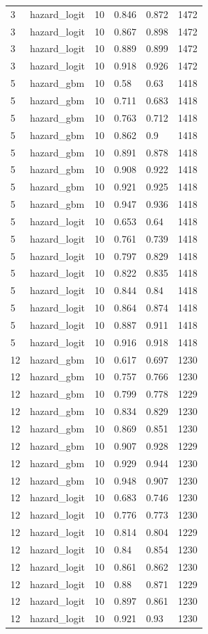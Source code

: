 \begin{tabular}{llllll}
3 & hazard\_logit & 10 & 0.846 & 0.872 & 1472 \\
3 & hazard\_logit & 10 & 0.867 & 0.898 & 1472 \\
3 & hazard\_logit & 10 & 0.889 & 0.899 & 1472 \\
3 & hazard\_logit & 10 & 0.918 & 0.926 & 1472 \\
5 & hazard\_gbm & 10 & 0.58 & 0.63 & 1418 \\
5 & hazard\_gbm & 10 & 0.711 & 0.683 & 1418 \\
5 & hazard\_gbm & 10 & 0.763 & 0.712 & 1418 \\
5 & hazard\_gbm & 10 & 0.862 & 0.9 & 1418 \\
5 & hazard\_gbm & 10 & 0.891 & 0.878 & 1418 \\
5 & hazard\_gbm & 10 & 0.908 & 0.922 & 1418 \\
5 & hazard\_gbm & 10 & 0.921 & 0.925 & 1418 \\
5 & hazard\_gbm & 10 & 0.947 & 0.936 & 1418 \\
5 & hazard\_logit & 10 & 0.653 & 0.64 & 1418 \\
5 & hazard\_logit & 10 & 0.761 & 0.739 & 1418 \\
5 & hazard\_logit & 10 & 0.797 & 0.829 & 1418 \\
5 & hazard\_logit & 10 & 0.822 & 0.835 & 1418 \\
5 & hazard\_logit & 10 & 0.844 & 0.84 & 1418 \\
5 & hazard\_logit & 10 & 0.864 & 0.874 & 1418 \\
5 & hazard\_logit & 10 & 0.887 & 0.911 & 1418 \\
5 & hazard\_logit & 10 & 0.916 & 0.918 & 1418 \\
12 & hazard\_gbm & 10 & 0.617 & 0.697 & 1230 \\
12 & hazard\_gbm & 10 & 0.757 & 0.766 & 1230 \\
12 & hazard\_gbm & 10 & 0.799 & 0.778 & 1229 \\
12 & hazard\_gbm & 10 & 0.834 & 0.829 & 1230 \\
12 & hazard\_gbm & 10 & 0.869 & 0.851 & 1230 \\
12 & hazard\_gbm & 10 & 0.907 & 0.928 & 1229 \\
12 & hazard\_gbm & 10 & 0.929 & 0.944 & 1230 \\
12 & hazard\_gbm & 10 & 0.948 & 0.907 & 1230 \\
12 & hazard\_logit & 10 & 0.683 & 0.746 & 1230 \\
12 & hazard\_logit & 10 & 0.776 & 0.773 & 1230 \\
12 & hazard\_logit & 10 & 0.814 & 0.804 & 1229 \\
12 & hazard\_logit & 10 & 0.84 & 0.854 & 1230 \\
12 & hazard\_logit & 10 & 0.861 & 0.862 & 1230 \\
12 & hazard\_logit & 10 & 0.88 & 0.871 & 1229 \\
12 & hazard\_logit & 10 & 0.897 & 0.861 & 1230 \\
12 & hazard\_logit & 10 & 0.921 & 0.93 & 1230 \\
\bottomrule
\end{tabular}